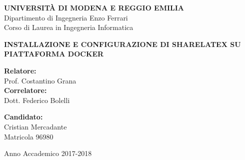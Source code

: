 \thispagestyle{empty}
\vspace*{-1. cm}
\begin{center}
  \Large
  \textbf{UNIVERSIT\`A DI MODENA E REGGIO EMILIA}\\
  
  \vspace{0.25 cm}
  \Large
  Dipartimento di Ingegneria Enzo Ferrari\\
  Corso di Laurea in Ingegneria Informatica\\
  \vspace*{5 cm} \LARGE

  \textbf{INSTALLAZIONE E CONFIGURAZIONE DI SHARELATEX SU PIATTAFORMA DOCKER}\\
  
\end{center}

\vspace*{2.5 cm}
\Large

\begin{flushleft}
  \textbf{Relatore:}\\
  Prof. Costantino Grana\\
  \vspace*{0.25 cm}
  \textbf{Correlatore:}\\
  Dott. Federico Bolelli 
\end{flushleft}


\begin{flushright}
  \textbf{Candidato:}\\
  Cristian Mercadante\\
  Matricola 96980
\end{flushright}

\vspace*{2 cm}

\begin{center}
  Anno Accademico 2017-2018
\end{center} \clearpage
\normalsize

